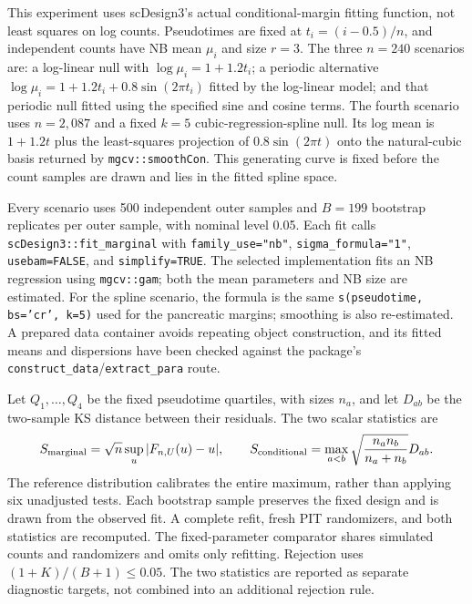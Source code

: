 \documentclass[12pt]{article}
\theoremstyle{remark}
\begin{document}
This experiment uses scDesign3's actual conditional-margin fitting function,
not least squares on log counts. Pseudotimes are fixed at
$t_i=(i-0.5)/n$, and independent counts have NB mean $\mu_i$ and size $r=3$.
The three $n=240$ scenarios are: a log-linear null with
$\log\mu_i=1+1.2t_i$; a periodic alternative
$\log\mu_i=1+1.2t_i+0.8\sin(2\pi t_i)$ fitted by the log-linear model;
and that periodic null fitted using the specified sine and cosine terms.
The fourth scenario uses $n=2,087$ and a fixed $k=5$ cubic-regression-spline
null. Its log mean is $1+1.2t$ plus the least-squares projection of
$0.8\sin(2\pi t)$ onto the natural-cubic basis returned by
\texttt{mgcv::smoothCon}. This generating curve is fixed before the count
samples are drawn and lies in the fitted spline space.

Every scenario uses 500 independent outer samples and $B=199$ bootstrap
replicates per outer sample, with nominal level 0.05. Each fit calls
\texttt{scDesign3::fit\_marginal} with \texttt{family\_use="nb"},
\texttt{sigma\_formula="1"}, \texttt{usebam=FALSE}, and
\texttt{simplify=TRUE}. The selected implementation fits an NB regression
using \texttt{mgcv::gam}; both the mean parameters and NB size are estimated.
For the spline scenario, the formula is the same
\texttt{s(pseudotime, bs='cr', k=5)} used for the pancreatic margins;
smoothing is also re-estimated. A prepared data container avoids repeating
object construction, and its fitted means and dispersions have been checked
against the package's \texttt{construct\_data}/\texttt{extract\_para} route.

Let $Q_1,\ldots,Q_4$ be the fixed pseudotime quartiles, with sizes $n_a$,
and let $D_{ab}$ be the two-sample KS distance between their residuals.
The two scalar statistics are
\[
S_{\rm marginal}=\sqrt n\sup_u|F_{n,U}(u)-u|,
\qquad
S_{\rm conditional}=\max_{a<b}
\sqrt{\frac{n_a n_b}{n_a+n_b}}D_{ab}.
\]
The reference distribution calibrates the entire maximum, rather than
applying six unadjusted tests. Each bootstrap sample preserves the fixed
design and is drawn from the observed fit. A complete refit, fresh PIT
randomizers, and both statistics are recomputed. The fixed-parameter
comparator shares simulated counts and randomizers and omits only refitting.
Rejection uses $(1+K)/(B+1)\le0.05$. The two statistics are reported as
separate diagnostic targets, not combined into an additional rejection rule.
\end{document}

